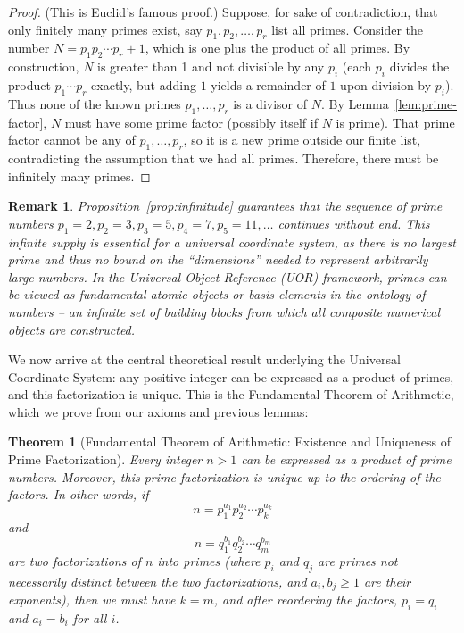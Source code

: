 \documentclass[11pt]{article}
\newtheorem{theorem}{Theorem}
\newtheorem{remark}{Remark}
\begin{document}
\begin{proof}
(This is Euclid's famous proof.) Suppose, for sake of contradiction, that only finitely many primes exist, say $p_1, p_2, \ldots, p_r$ list all primes. Consider the number $N = p_1 p_2 \cdots p_r + 1$, which is one plus the product of all primes. By construction, $N$ is greater than 1 and not divisible by any $p_i$ (each $p_i$ divides the product $p_1\cdots p_r$ exactly, but adding $1$ yields a remainder of $1$ upon division by $p_i$). Thus none of the known primes $p_1,\dots,p_r$ is a divisor of $N$. By Lemma~\ref{lem:prime-factor}, $N$ must have some prime factor (possibly itself if $N$ is prime). That prime factor cannot be any of $p_1,\dots,p_r$, so it is a new prime outside our finite list, contradicting the assumption that we had all primes. Therefore, there must be infinitely many primes.
\end{proof}

\begin{remark}
Proposition~\ref{prop:infinitude} guarantees that the sequence of prime numbers $p_1=2, p_2=3, p_3=5, p_4=7, p_5=11, \dots$ continues without end. This infinite supply is essential for a \emph{universal} coordinate system, as there is no largest prime and thus no bound on the “dimensions” needed to represent arbitrarily large numbers. In the Universal Object Reference (UOR) framework, primes can be viewed as fundamental \emph{atomic objects} or basis elements in the ontology of numbers -- an infinite set of building blocks from which all composite numerical objects are constructed.
\end{remark}

We now arrive at the central theoretical result underlying the Universal Coordinate System: any positive integer can be expressed as a product of primes, and this factorization is unique. This is the Fundamental Theorem of Arithmetic, which we prove from our axioms and previous lemmas:

\begin{theorem}[Fundamental Theorem of Arithmetic: Existence and Uniqueness of Prime Factorization]\label{thm:FTA}
Every integer $n > 1$ can be expressed as a product of prime numbers. Moreover, this prime factorization is unique up to the ordering of the factors. In other words, if 
\[ n = p_1^{a_1} p_2^{a_2} \cdots p_k^{a_k} \]
and 
\[ n = q_1^{b_1} q_2^{b_2} \cdots q_m^{b_m} \]
are two factorizations of $n$ into primes (where $p_i$ and $q_j$ are primes not necessarily distinct between the two factorizations, and $a_i, b_j \ge 1$ are their exponents), then we must have $k=m$, and after reordering the factors, $p_i = q_i$ and $a_i = b_i$ for all $i$. 
\end{theorem}
\end{document}
